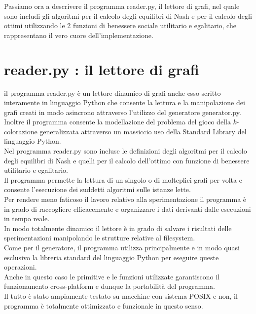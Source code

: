 Passiamo ora a descrivere il programma reader.py, il lettore di grafi, nel quale sono includi gli algoritmi per il calcolo degli equilibri di Nash e per il calcolo degli ottimi utilizzando le 2 funzioni di benessere sociale utilitario e egalitario, che rappresentano il vero cuore dell'implementazione.\\


\section{reader.py : il lettore di grafi}
\justify
il programma reader.py è un lettore dinamico di grafi anche esso scritto interamente in linguaggio Python che consente la lettura e la manipolazione dei grafi creati in modo asincrono attraverso l'utilizzo del generatore generator.py.\\

Inoltre il programma consente la modellazione del problema del gioco della \(k\)-colorazione generalizzata attraverso un massiccio uso della Standard Library del linguaggio Python.\\

Nel programma reader.py sono incluse le definizioni degli algoritmi per il calcolo degli equilibri di Nash e quelli per il calcolo dell'ottimo con funzione di benessere utilitario e egalitario.\\
Il programma permette la lettura di un singolo o di molteplici grafi per volta e consente l'esecuzione dei suddetti algoritmi sulle istanze lette.\\

Per rendere meno faticoso il lavoro relativo alla sperimentazione il programma è in grado di raccogliere efficacemente e organizzare i dati derivanti dalle esecuzioni in tempo reale.\\

In modo totalmente dinamico il lettore è in grado di salvare i risultati delle sperimentazioni manipolando le strutture relative al filesystem.\\
Come per il generatore, il programma utilizza principalmente e in modo quasi esclusivo la libreria standard del linguaggio Python per eseguire queste operazioni.\\
Anche in questo caso le primitive e le funzioni utilizzate garantiscono il funzionamento cross-platform e dunque la portabilità del programma.\\ Il tutto è stato ampiamente testato su macchine con sistema POSIX e non, il programma è totalmente ottimizzato e funzionale in questo senso.\\

